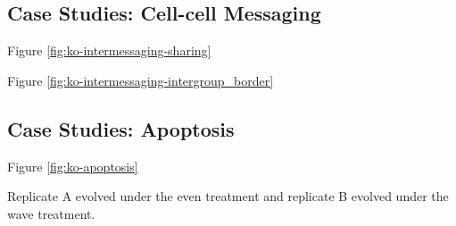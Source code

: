 \subsection{Case Studies: Cell-cell Messaging} \label{sec:cell-cell-messaging}





Figure \ref{fig:ko-intermessaging-sharing}

Figure \ref{fig:ko-intermessaging-intergroup_border}

\subsection{Case Studies: Apoptosis} \label{sec:apoptosis}



Figure \ref{fig:ko-apoptosis}

Replicate A evolved under the even treatment and replicate B evolved under the wave treatment.
